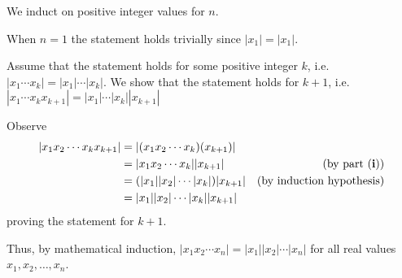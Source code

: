 \begin{questions}
\begin{partquestions}{\roman*}
        \item We induct on positive integer values for $n$.

        When $n = 1$ the statement holds trivially since $|x_1| = |x_1|$.

        Assume that the statement holds for some positive integer $k$, i.e. $|x_1\cdots x_k| = |x_1|\cdots|x_k|$. We show that the statement holds for $k+1$, i.e. $|x_1\cdots x_kx_{k+1}| = |x_1|\cdots|x_k||x_{k+1}|$

        Observe
        \begin{align*}
            |x_1x_2\cdots x_kx_{k+1}| &= |(x_1x_2\cdots x_k)(x_{k+1})|\\
            &= |x_1x_2\cdots x_k||x_{k+1}| & (\text{by part (\textbf{i})})\\
            &= (|x_1||x_2|\cdots|x_k|)|x_{k+1}| & (\text{by induction hypothesis})\\
            &= |x_1||x_2|\cdots|x_k||x_{k+1}|
        \end{align*}
        proving the statement for $k + 1$.

        Thus, by mathematical induction, $|x_1x_2\cdots x_n| = |x_1||x_2|\cdots|x_n|$ for all real values $x_1, x_2, \dots, x_n$.
    \end{partquestions}
\end{questions}
